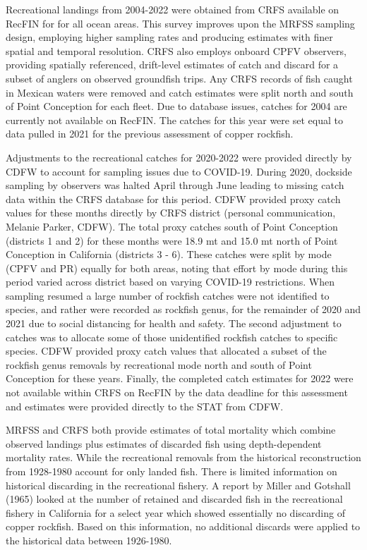 \documentclass[11pt,
  english,
  letterpaper,
]{article}
\begin{document}
Recreational landings from 2004-2022 were obtained from CRFS available on RecFIN for for all ocean areas. This survey improves upon the MRFSS sampling design, employing higher sampling rates and producing estimates with finer spatial and temporal resolution. CRFS also employs onboard CPFV observers, providing spatially referenced, drift-level estimates of catch and discard for a subset of anglers on observed groundfish trips. Any CRFS records of fish caught in Mexican waters were removed and catch estimates were split north and south of Point Conception for each fleet. Due to database issues, catches for 2004 are currently not available on RecFIN. The catches for this year were set equal to data pulled in 2021 for the previous assessment of copper rockfish.

Adjustments to the recreational catches for 2020-2022 were provided directly by CDFW to account for sampling issues due to COVID-19. During 2020, dockside sampling by observers was halted April through June leading to missing catch data within the CRFS database for this period. CDFW provided proxy catch values for these months directly by CRFS district (personal communication, Melanie Parker, CDFW). The total proxy catches south of Point Conception (districts 1 and 2) for these months were 18.9 mt and 15.0 mt north of Point Conception in California (districts 3 - 6). These catches were split by mode (CPFV and PR) equally for both areas, noting that effort by mode during this period varied across district based on varying COVID-19 restrictions. When sampling resumed a large number of rockfish catches were not identified to species, and rather were recorded as rockfish genus, for the remainder of 2020 and 2021 due to social distancing for health and safety. The second adjustment to catches was to allocate some of those unidentified rockfish catches to specific species. CDFW provided proxy catch values that allocated a subset of the rockfish genus removals by recreational mode north and south of Point Conception for these years. Finally, the completed catch estimates for 2022 were not available within CRFS on RecFIN by the data deadline for this assessment and estimates were provided directly to the STAT from CDFW.

MRFSS and CRFS both provide estimates of total mortality which combine observed landings plus estimates of discarded fish using depth-dependent mortality rates. While the recreational removals from the historical reconstruction from 1928-1980 account for only landed fish. There is limited information on historical discarding in the recreational fishery. A report by Miller and Gotshall (1965) looked at the number of retained and discarded fish in the recreational fishery in California for a select year which showed essentially no discarding of copper rockfish. Based on this information, no additional discards were applied to the historical data between 1926-1980.
\end{document}
